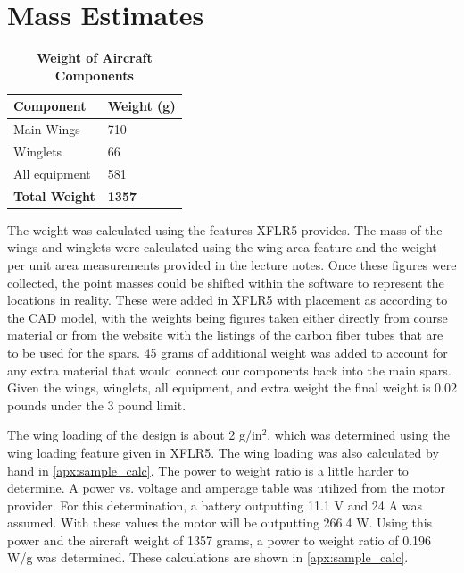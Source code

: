 \section{Mass Estimates}

    \begin{table}[H]
        \begin{center}
        \caption{\textbf{Weight of Aircraft Components}} \label{table:Weights}
        \begin{tabular}{|p{1in}|p{1in}|} %
        \hline
            \textbf{Component} & \textbf{Weight (g)} \\ \hline
            Main Wings & 710 \\ \hline
            Winglets & 66 \\ \hline
            All equipment & 581 \\ \hline
            \textbf{Total Weight} & \textbf{1357} \\ \hline
        \end{tabular}
        \end{center}
    \end{table}

    The weight was calculated using the features XFLR5 provides. The mass of the wings and winglets were calculated using the wing area feature and the weight per unit area measurements provided in the lecture notes. Once these figures were collected, the point masses could be shifted within the software to represent the locations in reality. These were added in XFLR5 with placement as according to the CAD model, with the weights being figures taken either directly from course material or from the website with the listings of the carbon fiber tubes that are to be used for the spars. 45 grams of additional weight was added to account for any extra material that would connect our components back into the main spars. Given the wings, winglets, all equipment, and extra weight the final weight is 0.02 pounds under the 3 pound limit. 
    
    The wing loading of the design is about 2 g/in$^2$, which was determined using the wing loading feature given in XFLR5. The wing loading was also calculated by hand in \ref{apx:sample_calc}. The power to weight ratio is a little harder to determine. A power vs. voltage and amperage table was utilized from the motor provider. For this determination, a battery outputting 11.1 V and 24 A was assumed. With these values the motor will be outputting 266.4 W. Using this power and the aircraft weight of 1357 grams, a power to weight ratio of 0.196 W/g was determined. These calculations are shown in \ref{apx:sample_calc}.



